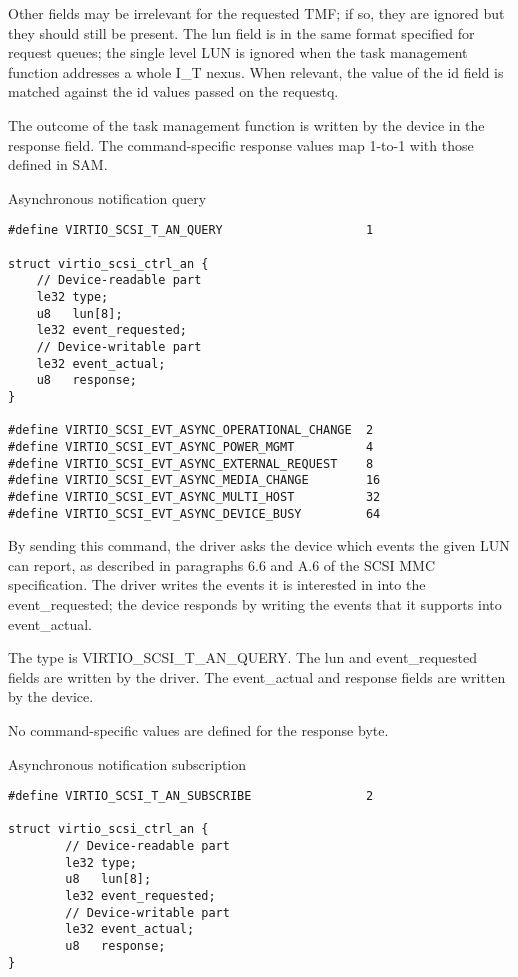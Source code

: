   Other fields may be irrelevant for the requested TMF; if so,
  they are ignored but they should still be present. The lun
  field is in the same format specified for request queues; the
  single level LUN is ignored when the task management function
  addresses a whole I_T nexus. When relevant, the value of the id
  field is matched against the id values passed on the requestq.

  The outcome of the task management function is written by the
  device in the response field. The command-specific response
  values map 1-to-1 with those defined in SAM.

  Asynchronous notification query

\begin{lstlisting}
#define VIRTIO_SCSI_T_AN_QUERY                    1

struct virtio_scsi_ctrl_an {
    // Device-readable part
    le32 type;
    u8   lun[8];
    le32 event_requested;
    // Device-writable part
    le32 event_actual;
    u8   response;
}

#define VIRTIO_SCSI_EVT_ASYNC_OPERATIONAL_CHANGE  2
#define VIRTIO_SCSI_EVT_ASYNC_POWER_MGMT          4
#define VIRTIO_SCSI_EVT_ASYNC_EXTERNAL_REQUEST    8
#define VIRTIO_SCSI_EVT_ASYNC_MEDIA_CHANGE        16
#define VIRTIO_SCSI_EVT_ASYNC_MULTI_HOST          32
#define VIRTIO_SCSI_EVT_ASYNC_DEVICE_BUSY         64
\end{lstlisting}

  By sending this command, the driver asks the device which
  events the given LUN can report, as described in paragraphs 6.6
  and A.6 of the SCSI MMC specification. The driver writes the
  events it is interested in into the event_requested; the device
  responds by writing the events that it supports into
  event_actual.

  The type is VIRTIO_SCSI_T_AN_QUERY. The lun and event_requested
  fields are written by the driver. The event_actual and response
  fields are written by the device.

  No command-specific values are defined for the response byte.

  Asynchronous notification subscription
\begin{lstlisting}
#define VIRTIO_SCSI_T_AN_SUBSCRIBE                2

struct virtio_scsi_ctrl_an {
        // Device-readable part
        le32 type;
        u8   lun[8];
        le32 event_requested;
        // Device-writable part
        le32 event_actual;
        u8   response;
}
\end{lstlisting}

